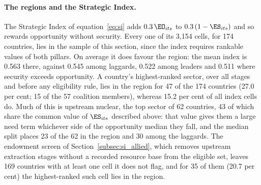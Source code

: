 \paragraph{The regions and the Strategic Index.} The Strategic Index of equation~\eqref{eq:si}
adds $0.3\,\EO_{its}$ to $0.3\,(1-\ES_{its})$ and so rewards opportunity without security. Every
one of its 3{,}154 cells, for 174 countries, lies in the sample of this section, since the index
requires rankable values of both pillars. On average it does favour the region: the mean index is
0.563 there, against 0.545 among laggards, 0.522 among leaders and 0.511 where security exceeds
opportunity. A country's highest-ranked sector, over all stages and before any eligibility rule,
lies in the region for 47 of the 174 countries (27.0 per cent; 15 of the 57 coalition members),
whereas 15.2 per cent of all index cells do. Much of this is upstream nuclear, the top sector of
62 countries, 43 of which share the common value of $\ES_{its}$ described above: that value gives
them a large need term whichever side of the opportunity median they fall, and the median split
places 23 of the 62 in the region and 30 among the laggards. The endowment screen of
Section~\ref{subsec:si_allied}, which removes upstream extraction stages without a recorded
resource base from the eligible set, leaves 169 countries with at least one cell it does not flag,
and for 35 of them (20.7 per cent) the highest-ranked such cell lies in the region.

